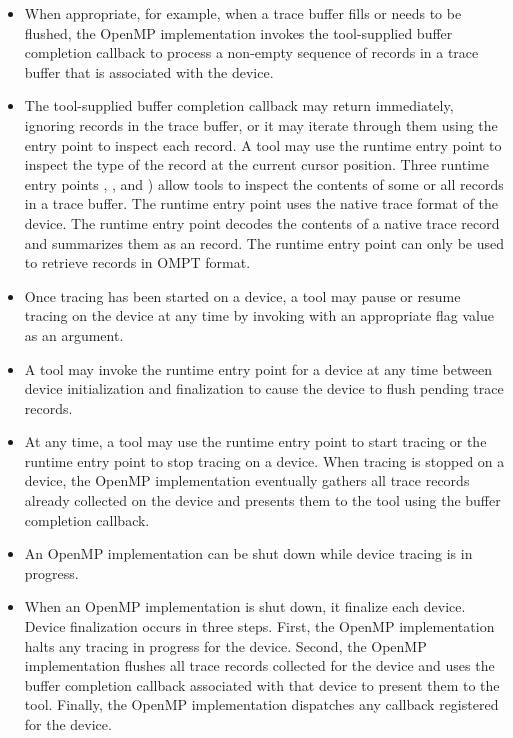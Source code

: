 \begin{itemize}
\item When appropriate, for example, when a trace buffer fills or needs to be
      flushed, the OpenMP implementation invokes the tool-supplied buffer
      completion callback to process a non-empty sequence of records in a 
      trace buffer that is associated with the device.
\item The tool-supplied buffer completion callback may return immediately, 
      ignoring records in the trace buffer, or it may iterate through them 
      using the  entry point to inspect 
      each record. A tool may use the  runtime 
      entry point to inspect the type of the record at the current cursor 
      position. Three runtime entry points , 
      , and ) 
      allow tools to inspect the contents of some or all records in a trace 
      buffer. The  runtime entry point uses 
      the native trace format of the device. The  
      runtime entry point decodes the contents of a native trace record and 
      summarizes them as an  record. The 
       runtime entry point can only be used to
      retrieve records in OMPT format.
\item Once tracing has been started on a device, a tool may pause or resume
      tracing on the device at any time by invoking  
      with an appropriate flag value as an argument.
\item A tool may invoke  the  runtime entry point for a
      device at any time between device initialization and finalization to cause 
      the device to flush pending trace records.
\item At any time, a tool may use the  runtime entry point
      to start tracing or the  runtime entry point to stop 
      tracing on a device. When tracing is stopped on a device, the OpenMP 
      implementation eventually gathers all trace records already collected 
      on the device and presents them to the tool using the buffer completion callback.
\item An OpenMP implementation can be shut down while device tracing is in progress.
\item When an OpenMP implementation is shut down, it finalize each device. Device 
      finalization occurs in three steps. First, the OpenMP implementation halts any 
      tracing in progress for the device. Second, the OpenMP implementation flushes 
      all trace records collected for the device and uses the buffer completion 
      callback associated with that device to present them to the tool. Finally, 
      the OpenMP implementation dispatches any  
      callback registered for the device.
\end{itemize}

